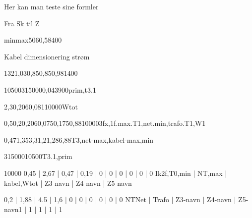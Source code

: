 \documentclass[a4paper,oneside,10pt,danish]{report}
\begin{document}
Her kan man teste sine formler

 
Fra Sk til Z
\begin{FraSkTilZ}{min}{max}{50}{6}{0,58}{400}
\end{FraSkTilZ}

Kabel dimensionering strøm
\begin{Iz,min}{132}{1,03}{0,85}{0,85}{0,98}{1}{400}
\end{Iz,min}

\begin{Ztrafo}{10500}{315000}{0,04}{3900}{prim,t3.1}
\end{Ztrafo}

\begin{Zkabel}{2,3}{0,206}{0,081}{10000}{Wtot}
\end{Zkabel}


\begin{ZtilIkHV}{0,5}{0,2}{0,206}{0,075}{0,175}{0,88}{10000}{3fx,1f.max.T1,net.min,trafo.T1,W1}
\end{ZtilIkHV}

\begin{Ik1MinSekTrafoHV}{0,47}{1,35}{3,3}{1,2}{1,28}{6,88}{T3,net-max,kabel-max,min}
\end{Ik1MinSekTrafoHV}

\begin{TrafoFuldlast}{315000}{10500}{T3.1,prim}
\end{TrafoFuldlast}

\begin{HV-ZtilIk2f}{10000}{ 0,45 | 2,67 | 0,47 | 0,19 | 0 | 0 | 0 | 0 | 0 | 0 }{Ik2f,T0,min | NT,max | kabel,Wtot | Z3 navn | Z4 navn | Z5 navn}
\end{HV-ZtilIk2f}

\begin{Ztotal}{ 0,2 | 1,88 | 4.5 | 1,6 | 0 | 0 | 0 | 0 | 0 | 0 }{NT}{Net | Trafo | Z3-navn | Z4-navn | Z5-navn}{1 | 1 | 1 | 1 | 1}
\end{Ztotal}
\end{document}
